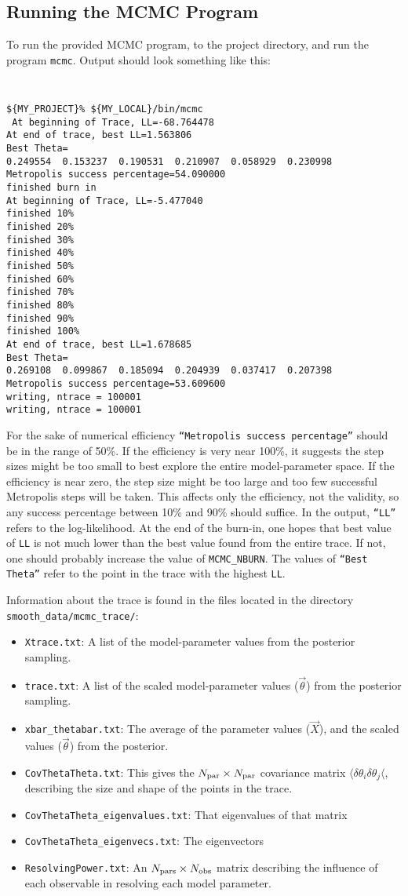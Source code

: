 \documentclass[UserManual.tex]{subfiles}
\begin{document}
\subsection{Running the MCMC Program}
To run the provided MCMC program, to the project directory, and run the program {\tt mcmc}. Output should look something like this:
{\tt
\begin{verbatim}
${MY_PROJECT}% ${MY_LOCAL}/bin/mcmc
 At beginning of Trace, LL=-68.764478
At end of trace, best LL=1.563806
Best Theta=
0.249554  0.153237  0.190531  0.210907  0.058929  0.230998  
Metropolis success percentage=54.090000
finished burn in
At beginning of Trace, LL=-5.477040
finished 10%
finished 20%
finished 30%
finished 40%
finished 50%
finished 60%
finished 70%
finished 80%
finished 90%
finished 100%
At end of trace, best LL=1.678685
Best Theta=
0.269108  0.099867  0.185094  0.204939  0.037417  0.207398  
Metropolis success percentage=53.609600
writing, ntrace = 100001
writing, ntrace = 100001
\end{verbatim}}
For the sake of numerical efficiency {\tt ``Metropolis success percentage''} should be in the range of 50\%. If the efficiency is very near 100\%, it suggests the step sizes might be too small to best explore the entire model-parameter space. If the efficiency is near zero, the step size might be too large and too few successful Metropolis steps will be taken. This affects only the efficiency, not the validity, so any success percentage between 10\% and 90\% should suffice. In the output, {\tt ``LL''} refers to the log-likelihood. At the end of the burn-in, one hopes that best value of {\tt LL} is not much lower than the best value found from the entire trace. If not, one should probably increase the value of {\tt MCMC\_NBURN}. The values of {\tt ``Best Theta''} refer to the point in the trace with the highest {\tt LL}. 

Information about the trace is found in the files located in the directory {\tt smooth\_data/mcmc\_trace/}:
\begin{itemize}
\item {\tt Xtrace.txt}: A list of the model-parameter values from the posterior sampling.
\item {\tt trace.txt}: A list of the scaled model-parameter values ($\vec{\theta}$) from the posterior sampling.
\item {\tt xbar\_thetabar.txt}: The average of the parameter values ($\vec{X}$), and the scaled values ($\vec{\theta}$) from the posterior.
\item {\tt CovThetaTheta.txt}: This gives the $N_{\rm par}\times N_{\rm par}$ covariance matrix $\langle\delta \theta_i\delta\theta_j\langle$, describing the size and shape of the points in the trace.
\item {\tt CovThetaTheta\_eigenvalues.txt}: That eigenvalues of that matrix
\item {\tt CovThetaTheta\_eigenvecs.txt}: The eigenvectors
\item {\tt ResolvingPower.txt}: An $N_{\rm pars}\times N_{\rm obs}$ matrix describing the influence of each observable in resolving each model parameter.
\end{itemize}
\end{document}
